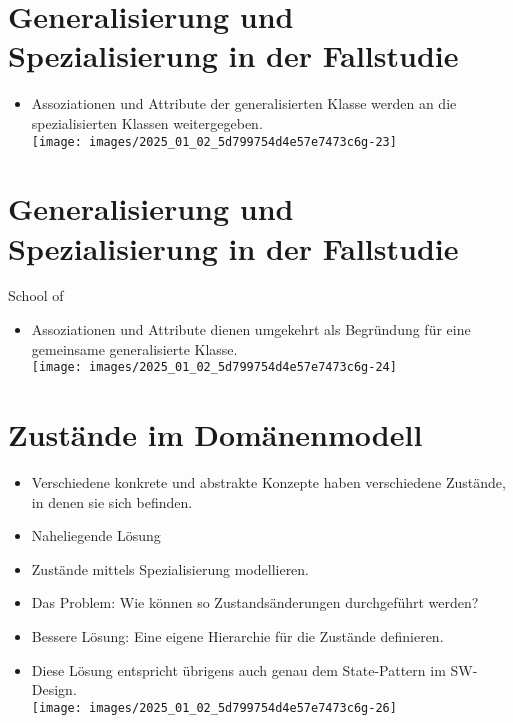 \documentclass[10pt]{article}
\begin{document}
\section*{Generalisierung und Spezialisierung in der Fallstudie}
\begin{itemize}
  \item Assoziationen und Attribute der generalisierten Klasse werden an die spezialisierten Klassen weitergegeben.\\
\texttt{[image: images/2025\_01\_02\_5d799754d4e57e7473c6g-23]}
\end{itemize}

\section*{Generalisierung und Spezialisierung in der Fallstudie}
School of

\begin{itemize}
  \item Assoziationen und Attribute dienen umgekehrt als Begründung für eine gemeinsame generalisierte Klasse.\\
\texttt{[image: images/2025\_01\_02\_5d799754d4e57e7473c6g-24]}
\end{itemize}

\section*{Zustände im Domänenmodell}
\begin{itemize}
  \item Verschiedene konkrete und abstrakte Konzepte haben verschiedene Zustände, in denen sie sich befinden.
  \item Naheliegende Lösung
  \item Zustände mittels Spezialisierung modellieren.
  \item Das Problem: Wie können so Zustandsänderungen durchgeführt werden?
  \item Bessere Lösung: Eine eigene Hierarchie für die Zustände definieren.
  \item Diese Lösung entspricht übrigens auch genau dem State-Pattern im SW-Design.\\
\texttt{[image: images/2025\_01\_02\_5d799754d4e57e7473c6g-26]}
\end{itemize}
\end{document}
